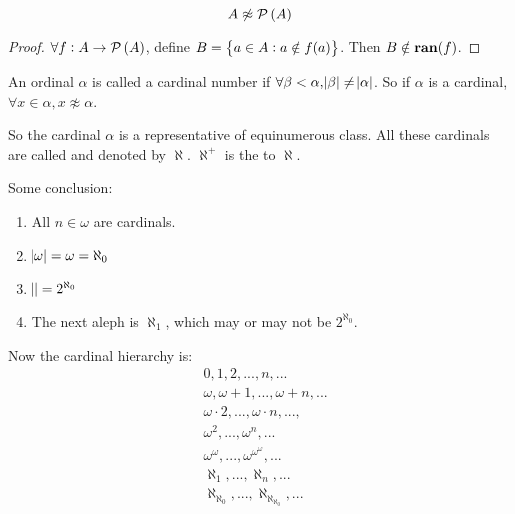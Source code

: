 \begin{theorem}
    \begin{equation}
        A \not\approx \mathcal{P}\left( A \right)
    \end{equation}    
\end{theorem}
\begin{proof}
    $\forall f: A \rightarrow \mathcal{P}\left( A \right)$, define $B = \set{ a \in A: a \notin f(a)}$. Then $B\notin \mathbf{ran}(f)$.
\end{proof}

\begin{definition}
    An ordinal $\alpha$ is called a cardinal number if $\forall \beta < \alpha, \abs{\beta} \neq \abs{\alpha}$. So if $\alpha$ is a cardinal, $\forall x \in \alpha, x \not\approx \alpha$.
\end{definition}

So the cardinal $\alpha$ is a representative of equinumerous class. All these cardinals are called  and denoted by $\aleph$. $\aleph^{+}$ is the  to $\aleph$.

Some conclusion:
\begin{enumerate}
    \item All $n \in \omega$ are cardinals.
    \item $\abs{\omega} = \omega = \aleph_0$
    \item $\absolutevalue{\real} = 2^{\aleph_0}$
    \item The next aleph is $\aleph_1$, which may or may not be $2^{\aleph_0}$.
\end{enumerate}

Now the cardinal hierarchy is:
\begin{equation}
\begin{aligned}
    & 0,1,2,..., n, ... \\
    & \omega, \omega +1, ..., \omega + n, ... \\
    & \omega \cdot 2, ...,  \omega \cdot n , ..., \\
    & \omega^2, ..., \omega^n, ... \\
    & \omega^\omega, ..., \omega^{\omega^\omega}, ... \\
    & \aleph_1, ..., \aleph_n, ... \\
    & \aleph_{\aleph_0}, ... , \aleph_{\aleph_{\aleph_0}}, ...
\end{aligned}
\end{equation}


